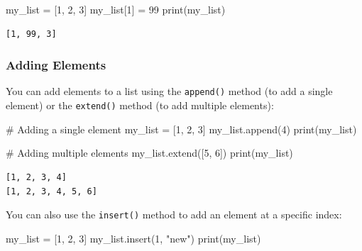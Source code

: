 \documentclass[
  letterpaper,
  DIV=11,
  numbers=noendperiod]{scrreprt}
\newenvironment{Shaded}{\begin{snugshade}}{\end{snugshade}}
\newcommand{\BuiltInTok}[1]{\textcolor[rgb]{0.00,0.23,0.31}{#1}}
\newcommand{\CommentTok}[1]{\textcolor[rgb]{0.37,0.37,0.37}{#1}}
\newcommand{\DecValTok}[1]{\textcolor[rgb]{0.68,0.00,0.00}{#1}}
\newcommand{\NormalTok}[1]{\textcolor[rgb]{0.00,0.23,0.31}{#1}}
\newcommand{\OperatorTok}[1]{\textcolor[rgb]{0.37,0.37,0.37}{#1}}
\newcommand{\StringTok}[1]{\textcolor[rgb]{0.13,0.47,0.30}{#1}}
\begin{document}
\begin{Shaded}
\begin{Highlighting}[]
\NormalTok{my\_list }\OperatorTok{=}\NormalTok{ [}\DecValTok{1}\NormalTok{, }\DecValTok{2}\NormalTok{, }\DecValTok{3}\NormalTok{]}
\NormalTok{my\_list[}\DecValTok{1}\NormalTok{] }\OperatorTok{=} \DecValTok{99}  
\BuiltInTok{print}\NormalTok{(my\_list)  }
\end{Highlighting}
\end{Shaded}

\begin{verbatim}
[1, 99, 3]
\end{verbatim}

\hypertarget{adding-elements}{%
\subsubsection{Adding Elements}\label{adding-elements}}

You can add elements to a list using the \texttt{append()} method (to
add a single element) or the \texttt{extend()} method (to add multiple
elements):

\begin{Shaded}
\begin{Highlighting}[]
\CommentTok{\# Adding a single element}
\NormalTok{my\_list }\OperatorTok{=}\NormalTok{ [}\DecValTok{1}\NormalTok{, }\DecValTok{2}\NormalTok{, }\DecValTok{3}\NormalTok{]}
\NormalTok{my\_list.append(}\DecValTok{4}\NormalTok{)}
\BuiltInTok{print}\NormalTok{(my\_list)}

\CommentTok{\# Adding multiple elements}
\NormalTok{my\_list.extend([}\DecValTok{5}\NormalTok{, }\DecValTok{6}\NormalTok{])}
\BuiltInTok{print}\NormalTok{(my\_list)}
\end{Highlighting}
\end{Shaded}

\begin{verbatim}
[1, 2, 3, 4]
[1, 2, 3, 4, 5, 6]
\end{verbatim}

You can also use the \texttt{insert()} method to add an element at a
specific index:

\begin{Shaded}
\begin{Highlighting}[]
\NormalTok{my\_list }\OperatorTok{=}\NormalTok{ [}\DecValTok{1}\NormalTok{, }\DecValTok{2}\NormalTok{, }\DecValTok{3}\NormalTok{]}
\NormalTok{my\_list.insert(}\DecValTok{1}\NormalTok{, }\StringTok{"new"}\NormalTok{)}
\BuiltInTok{print}\NormalTok{(my\_list)  }
\end{Highlighting}
\end{Shaded}
\end{document}
